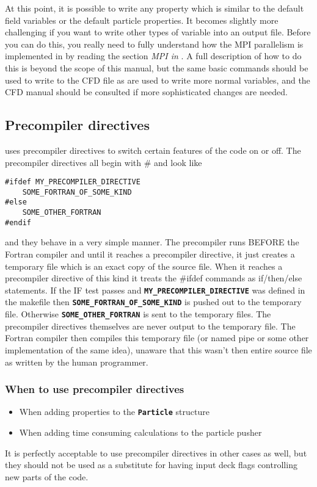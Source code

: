 \documentclass[12pt,a4paper]{article}
\newcommand{\simpleboxverbatim}{\begin{Verbatim}[obeytabs=true,frame=single,
  framerule=0.5mm,rulecolor=\color{warwickmid},formatcom=\color{black}]}
\newcommand{\inlinecode}[1]{{\color{warwickred} \bf\texttt{#1}}}
\newcommand{\EPOCH}{{\color{warwickdark}\fontfamily{phv}\selectfont{EPOCH}}}
\begin{document}
At this point, it is possible to write any property which is similar to the
default field variables or the default particle properties. It becomes slightly
more challenging if you want to write other types of variable into an output
file. Before you can do this, you really need to fully understand how the MPI
parallelism is implemented in {\EPOCH} by reading the section {\it MPI in
{\EPOCH}}. A full description of how to do this is beyond the scope of this
manual, but the same basic commands should be used to write to the CFD file as
are used to write more normal variables, and the CFD manual should be consulted
if more sophisticated changes are needed.

\pagebreak

\subsection{Precompiler directives}
{\EPOCH} uses precompiler directives to switch certain features of the code on or
off. The precompiler directives all begin with \# and look like
\simpleboxverbatim
#ifdef MY_PRECOMPILER_DIRECTIVE
	SOME_FORTRAN_OF_SOME_KIND
#else
	SOME_OTHER_FORTRAN
#endif
\end{Verbatim}
and they behave in a very simple manner. The precompiler runs BEFORE the
Fortran compiler and until it reaches a precompiler directive, it just creates
a temporary file which is an exact copy of the source file. When it reaches a
precompiler directive of this kind it treats the \#ifdef commands as
if/then/else statements. If the IF test passes and
\inlinecode{MY\_PRECOMPILER\_DIRECTIVE} was defined in the makefile then
\inlinecode{SOME\_FORTRAN\_OF\_SOME\_KIND} is pushed out to the temporary
file. Otherwise \inlinecode{SOME\_OTHER\_FORTRAN} is sent to the temporary
files. The precompiler directives themselves are never output to the temporary
file. The Fortran compiler then compiles this temporary file (or named pipe or
some other implementation of the same idea), unaware that this wasn't then
entire source file as written by the human programmer.

\subsubsection{When to use precompiler directives}
\begin{itemize}
\item When adding properties to the \inlinecode{Particle} structure
\item When adding time consuming calculations to the particle pusher
\end{itemize}
It is perfectly acceptable to use precompiler directives in other cases as
well, but they should not be used as a substitute for having input deck flags
controlling new parts of the code.
\end{document}
